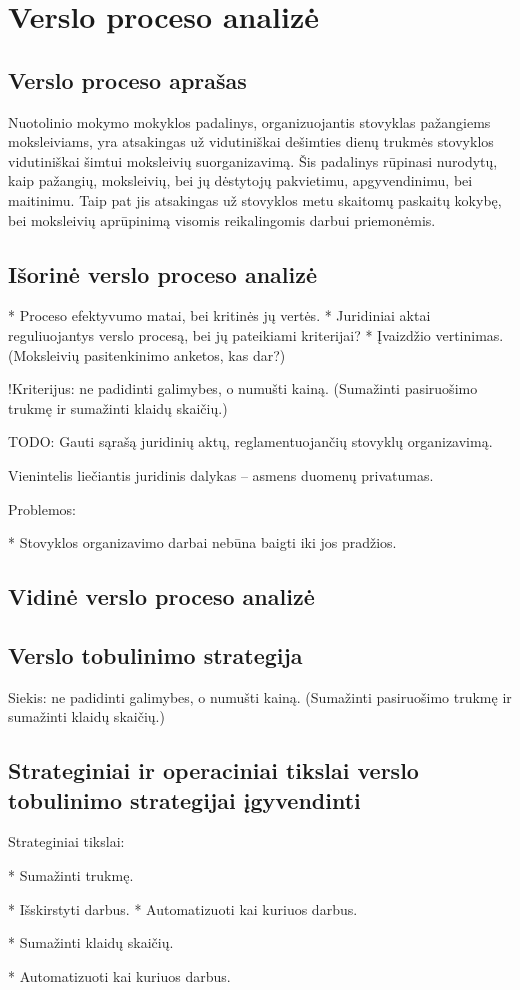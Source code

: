 \chapter{Verslo proceso analizė}


\section{Verslo proceso aprašas}

Nuotolinio mokymo mokyklos padalinys, organizuojantis stovyklas pažangiems
moksleiviams, yra atsakingas už vidutiniškai dešimties dienų trukmės
stovyklos vidutiniškai šimtui moksleivių suorganizavimą. Šis padalinys
rūpinasi nurodytų, kaip pažangių, moksleivių, bei jų dėstytojų pakvietimu, 
apgyvendinimu, bei maitinimu. Taip pat jis atsakingas už stovyklos metu 
skaitomų paskaitų kokybę, bei moksleivių aprūpinimą visomis reikalingomis
darbui priemonėmis.

\section{Išorinė verslo proceso analizė}

* Proceso efektyvumo matai, bei kritinės jų vertės.
* Juridiniai aktai reguliuojantys verslo procesą, bei jų pateikiami 
  kriterijai?
* Įvaizdžio vertinimas. (Moksleivių pasitenkinimo anketos, kas dar?)

!Kriterijus: ne padidinti galimybes, o numušti kainą. (Sumažinti 
pasiruošimo trukmę ir sumažinti klaidų skaičių.)

TODO: Gauti sąrašą juridinių aktų, reglamentuojančių stovyklų organizavimą.

Vienintelis liečiantis juridinis dalykas – asmens duomenų privatumas.

Problemos:

* Stovyklos organizavimo darbai nebūna baigti iki jos pradžios.


\section{Vidinė verslo proceso analizė}

\section{Verslo tobulinimo strategija}

Siekis: ne padidinti galimybes, o numušti kainą. (Sumažinti 
pasiruošimo trukmę ir sumažinti klaidų skaičių.)


\section{Strateginiai ir operaciniai tikslai verslo tobulinimo %
  strategijai įgyvendinti}

Strateginiai tikslai:

* Sumažinti trukmę.

  * Išskirstyti darbus.
  * Automatizuoti kai kuriuos darbus.

* Sumažinti klaidų skaičių.

  * Automatizuoti kai kuriuos darbus.
